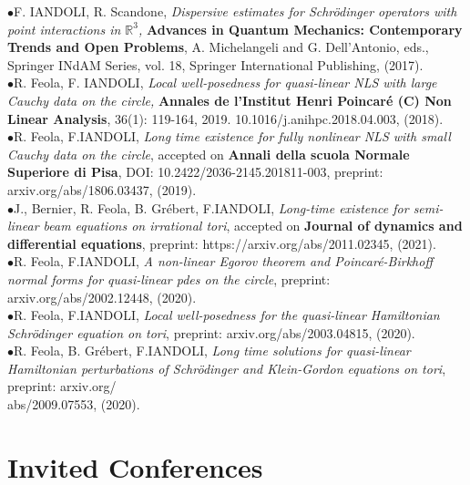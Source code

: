 \documentclass[margin,line,pifont,palatino,courier]{res}
\begin{document}
\begin{resume}
$\bullet${\rm{F. IANDOLI, R. Scandone}},  \textit{Dispersive estimates for Schr\"odinger operators with point interactions in $\mathbb{R}^3$,}  {\textbf {Advances in Quantum Mechanics: Contemporary Trends and Open Problems}}, A. Michelangeli and G. Dell'Antonio, eds., Springer INdAM Series, vol. 18, Springer International Publishing, (2017).\vspace{0.1cm}\\
$\bullet${\rm{R. Feola, F. IANDOLI}},  \textit{Local well-posedness for quasi-linear NLS with large Cauchy data on the circle,}  \textbf{Annales de l'Institut Henri Poincar\'e (C) Non Linear Analysis}, 36(1): 119-164, 2019. 10.1016/j.anihpc.2018.04.003, (2018).\vspace{0.1cm}\\
$\bullet${\rm{R. Feola, F.IANDOLI}}, \textit{Long time existence for fully nonlinear NLS with small Cauchy data on the circle}, accepted on  \textbf{Annali della scuola Normale Superiore di Pisa}, DOI: 10.2422/2036-2145.201811-003, preprint: arxiv.org/abs/1806.03437, 
(2019).\vspace{0.1cm}\\
$\bullet${\rm{J., Bernier, R. Feola, B. Gr\'ebert, F.IANDOLI}}, \textit{Long-time existence for semi-linear beam equations on irrational tori}, accepted on \textbf{Journal of dynamics and differential equations}, preprint: https://arxiv.org/abs/2011.02345, (2021). \vspace{0.1cm}\\
$\bullet${\rm{R. Feola, F.IANDOLI}}, \textit{A non-linear Egorov theorem and Poincar\'e-Birkhoff normal forms for quasi-linear pdes on the circle}, preprint: arxiv.org/abs/2002.12448, (2020).\vspace{0.1cm}\\
$\bullet${\rm{R. Feola, F.IANDOLI}}, \textit{Local well-posedness for the quasi-linear Hamiltonian Schr\"odinger equation on tori}, preprint: arxiv.org/abs/2003.04815, (2020).\vspace{0.1cm}\\
$\bullet${\rm{R. Feola, B. Gr\'ebert, F.IANDOLI}}, \textit{Long time solutions for quasi-linear Hamiltonian perturbations of Schr\"odinger and Klein-Gordon equations on tori}, preprint: arxiv.org/\\abs/2009.07553, (2020). \vspace{0.1cm}\\



\section{\sc Invited Conferences}


\end{resume}
\end{document}
